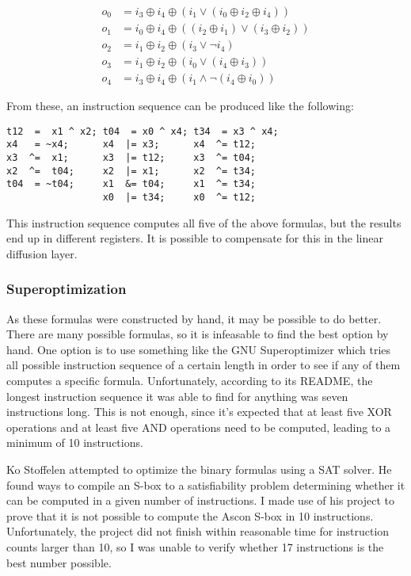 \begin{samepage}
\begin{align*}
   o_0 & = i_3 \oplus i_4 \oplus (i_1 \vee (i_0 \oplus i_2 \oplus i_4))
\\ o_1 & = i_0 \oplus i_4 \oplus ((i_2 \oplus i_1) \vee (i_3 \oplus i_2))
\\ o_2 & = i_1 \oplus i_2 \oplus (i_3 \vee \neg i_4)
\\ o_3 & = i_1 \oplus i_2 \oplus (i_0 \vee (i_4 \oplus i_3))
\\ o_4 & = i_3 \oplus i_4 \oplus (i_1 \wedge \neg (i_4 \oplus i_0))
\end{align*}
\end{samepage}

From these, an instruction sequence can be produced like the following:

\begin{samepage}
\begin{verbatim}
t12  =  x1 ^ x2; t04  = x0 ^ x4; t34  = x3 ^ x4;
x4   = ~x4;      x4  |= x3;      x4  ^= t12;
x3  ^=  x1;      x3  |= t12;     x3  ^= t04;
x2  ^=  t04;     x2  |= x1;      x2  ^= t34;
t04  = ~t04;     x1  &= t04;     x1  ^= t34;
                 x0  |= t34;     x0  ^= t12;
\end{verbatim}
\end{samepage}

This instruction sequence computes all five of the above formulas, but the
results end up in different registers. It is possible to compensate for this in
the linear diffusion layer.

\subsubsection{Superoptimization}

As these formulas were constructed by hand, it may be possible to do better.
There are many possible formulas, so it is infeasable to find the best option by
hand. One option is to use something like the GNU Superoptimizer which tries all
possible instruction sequence of a certain length in order to see if any of them
computes a specific formula. Unfortunately, according to its README, the longest
instruction sequence it was able to find for anything was seven instructions
long. This is not enough, since it's expected that at least five XOR operations
and at least five AND operations need to be computed, leading to a minimum of 10
instructions.

Ko Stoffelen\cite{sat} attempted to optimize the binary formulas using a SAT
solver. He found ways to compile an S-box to a satisfiability problem
determining whether it can be computed in a given number of instructions. I made
use of his project to prove that it is not possible to compute the Ascon S-box
in 10 instructions. Unfortunately, the project did not finish within reasonable
time for instruction counts larger than 10, so I was unable to verify whether 17
instructions is the best number possible.
